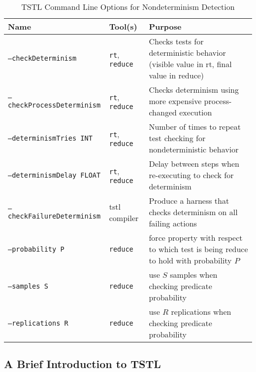 \begin{table*}
\centering
{\scriptsize
\caption{TSTL Command Line Options for
  Nondeterminism Detection}
\label{tab:options}
\begin{tabular}{l|l|l}
Name &  Tool(s) & Purpose \\
\hline
\hline
{\tt --checkDeterminism} & {\tt rt}, {\tt reduce} & Checks tests for deterministic
                                  behavior (visible value in rt, final
  value in reduce)\\
\hline
{\tt --checkProcessDeterminism} & {\tt rt}, {\tt reduce} & Checks determinism using more 
                                         expensive process-changed 
                                         execution \\
\hline
{\tt --determinismTries INT} & {\tt rt}, {\tt reduce} & Number of times to repeat test 
                                  checking for nondeterministic
                                  behavior \\
\hline 
{\tt --determinismDelay FLOAT} & {\tt rt}, {\tt reduce} & Delay between steps when 
                                  re-executing to check for
                                              determinism \\
\hline 
{\tt --checkFailureDeterminism} & tstl compiler & Produce a harness
                                                  that checks
                                                  determinism on all
                                                  failing actions \\
\hline 
{\tt --probability P} & {\tt reduce} & force property with respect to which 
                               test is being reduce to hold with 
                                 probability $P$ \\
\hline 
{\tt --samples S} & {\tt reduce} & use $S$ samples when checking predicate
                             probability\\
\hline 
{\tt --replications R} & {\tt reduce} & use $R$ replications when checking predicate probability\\
\hline
\hline

\end{tabular}
}
\end{table*}

\subsection{A Brief Introduction to TSTL}

